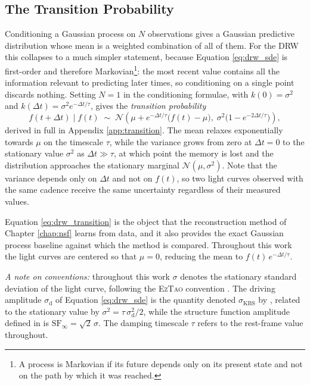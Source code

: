 \subsection{The Transition Probability}
\label{ssec:transition}


Conditioning a Gaussian process on $N$ observations gives a Gaussian predictive distribution whose mean is a weighted combination of all of them. For the DRW this collapses to a much simpler statement, because Equation \ref{eq:drw_sde} is first-order and therefore Markovian\footnote{A process is Markovian if its future depends only on its present state and not on the path by which it was reached.}: the most recent value contains all the information relevant to predicting later times, so conditioning on a single point discards nothing. Setting $N = 1$ in the conditioning formulae, with $k(0) = \sigma^2$ and $k(\Delta t) = \sigma^2 e^{-\Delta t/\tau}$, gives the \textit{transition probability}
\begin{equation}
    f(t+\Delta t) \mid f(t) \;\sim\; \mathcal{N}\!\left(\mu + e^{-\Delta t/\tau}\big(f(t) - \mu\big),\; \sigma^{2}\big(1 - e^{-2\Delta t/\tau}\big)\right),
    \label{eq:drw_transition}
\end{equation}
derived in full in Appendix \ref{app:transition}. The mean relaxes exponentially towards $\mu$ on the timescale $\tau$, while the variance grows from zero at $\Delta t = 0$ to the stationary value $\sigma^{2}$ as $\Delta t \gg \tau$, at which point the memory is lost and the distribution approaches the stationary marginal $\mathcal{N}(\mu, \sigma^{2})$. Note that the variance depends only on $\Delta t$ and not on $f(t)$, so two light curves observed with the same cadence receive the same uncertainty regardless of their measured values.

Equation \ref{eq:drw_transition} is the object that the reconstruction method of Chapter \ref{chap:nsf} learns from data, and it also provides the exact Gaussian process baseline against which the method is compared. Throughout this work the light curves are centered so that $\mu = 0$, reducing the mean to $f(t)\,e^{-\Delta t/\tau}$.%

\textit{A note on conventions:} throughout this work $\sigma$ denotes the stationary standard deviation of the light curve, following the \textsc{EzTao} convention \parencite{Yu2022Extao}. The driving amplitude $\sigma_\mathrm{d}$ of Equation \ref{eq:drw_sde} is the quantity denoted $\sigma_\mathrm{KBS}$ by \textcite{Kelly2009ThermalFluc}, related to the stationary value by $\sigma^2 = \tau\,\sigma_\mathrm{d}^2/2$, while the structure function amplitude defined in \cite{MacLeod2010ScalRel} is $\mathrm{SF}_\infty = \sqrt{2}\,\sigma$. The damping timescale $\tau$ refers to the rest-frame value throughout.

